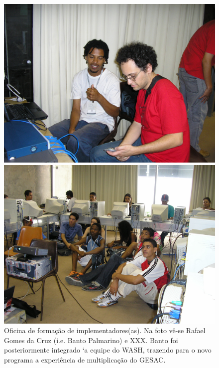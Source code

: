 \documentclass[
12pt,		%
openright,	%
twoside,  %
a4paper,			%
chapter=TITLE,		%
english,			%
french,				%
spanish,			%
brazil				%
]{USPSC-classe/USPSC}
\begin{document}
\begin{figure}[max size={\textwidth}{\textheight}]
\begin{minipage}[b]{0.4\linewidth}
        \centering
                \includegraphics[width=1.0\linewidth]{../../imagens/bantorafa.JPG}
                \caption{Oficina de forma\c{c}\~ao de implementadores(as). Na foto v\^e-se Rafael Gomes da Cruz (i.e. Banto Palmarino) e XXX. Banto foi posteriormente integrado `a equipe do WASH, trazendo para o novo programa a experi\^encia de multiplica\c{c}\~ao do GESAC.}
                \label{d2d74ac61c1b95a746858e8420d24348e1b48f51}
\end{minipage}%
\hspace{0.5cm}
\begin{minipage}[b]{0.4\linewidth}
        \centering
                \includegraphics[width=1.0\linewidth]{../../imagens/oficinalac.JPG}

\end{minipage}
\end{figure}
\end{document}
